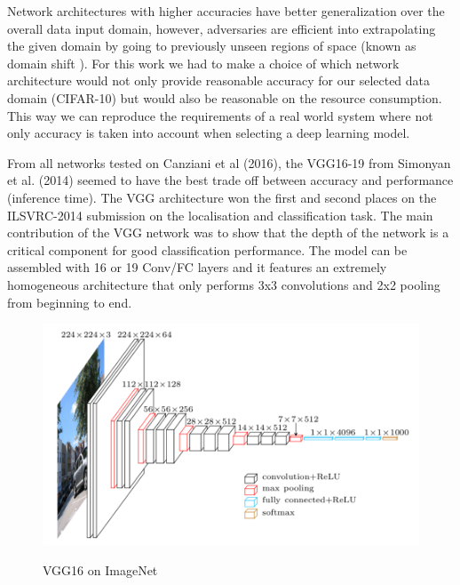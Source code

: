 Network architectures with higher accuracies have better generalization over the overall data input domain, however, adversaries are efficient into extrapolating the given domain by going to previously unseen regions of space (known as domain shift \cite{papernot2016}). For this work we had to make a choice of which network architecture would not only provide reasonable accuracy for our selected data domain (CIFAR-10) but would also be reasonable on the resource consumption. This way we can reproduce the requirements of a real world system where not only accuracy is taken into account when selecting a deep learning model.

From all networks tested on Canziani et al (2016), the VGG16-19 from Simonyan et al. (2014)  seemed to have the best trade off between accuracy and performance (inference time). The VGG architecture won the first and second places on the ILSVRC-2014 submission on the localisation and classification task. The main contribution of the VGG network was to show that the depth of the network is a critical component for good classification performance. The model can be assembled with 16 or 19 Conv/FC layers and it features an extremely homogeneous architecture that only performs 3x3 convolutions and 2x2 pooling from beginning to end.

\begin{figure}[!h]
	\centering
	\includegraphics[scale=0.6]{imagenet_vgg16.png}
	\caption{VGG16 on ImageNet}
	\cite{simonyan2014very}
	\label{fig:vgg16}
\end{figure}

